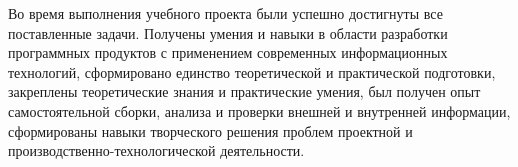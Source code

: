 \documentclass[../document.tex]{subfiles}
\begin{document}
\par Во время выполнения учебного проекта были успешно достигнуты все поставленные задачи.   Получены умения и навыки в области разработки программных продуктов с применением современных информационных технологий, сформировано единство теоретической и практической подготовки, закреплены теоретические знания и практические умения, был получен опыт самостоятельной сборки, анализа и проверки внешней и внутренней информации, сформированы навыки творческого решения проблем проектной и производственно-технологической деятельности.
\end{document}

